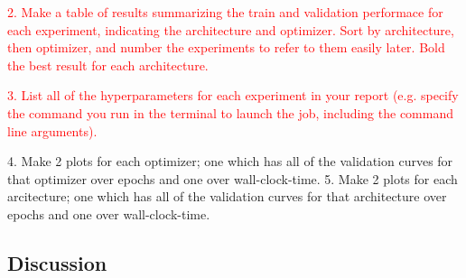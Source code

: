 \textcolor{red}{2. Make a table of results summarizing the train and validation performace for each experiment,
	indicating the architecture and optimizer. Sort by architecture, then optimizer, and number
	the experiments to refer to them easily later. Bold the best result for each architecture.}

\textcolor{red}{3. List all of the hyperparameters for each experiment in your report (e.g. specify the command
you run in the terminal to launch the job, including the command line arguments).}

4. Make 2 plots for each optimizer; one which has all of the validation curves for that optimizer
over epochs and one over wall-clock-time.
5. Make 2 plots for each arcitecture; one which has all of the validation curves for that architecture
over epochs and one over wall-clock-time.
\subsection{Discussion}
